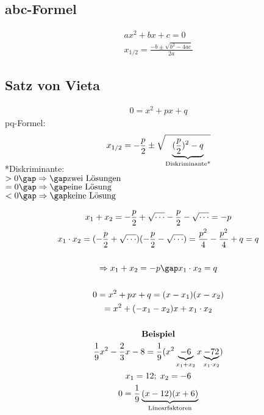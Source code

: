 \subsection{abc-Formel}
\begin{gather*}
  ax^2 + bx + c = 0 \\
  x_{1/2} = \frac{-b \pm \sqrt{b^2 - 4ac}}{2a}
\end{gather*}

\subsection{Satz von Vieta}
\begin{gather*}
  0 = x^2 + px + q
\end{gather*}
pq-Formel:
\begin{gather*}
  x_{1/2} = -\frac{p}{2} \pm \sqrt{\smash[b]{\underbrace{(\frac{p}{2})^2 - q}_{\text{Diskriminante*}}}}
\end{gather*}
\begin{onepage}
  *Diskriminante:\\
  $ > 0 \gap\Rightarrow\gap \text{zwei Lösungen} $ \\
  $ = 0 \gap\Rightarrow\gap \text{eine Lösung} $ \\
  $ < 0 \gap\Rightarrow\gap \text{keine Lösung} $
\end{onepage}
\begin{gather*}
  x_1 + x_2 = -\frac{p}{2} + \sqrt{\cdots} - \frac{p}{2} - \sqrt{\cdots} = -p \\
  x_1 \cdot x_2 = (-\frac{p}{2} + \sqrt{\cdots}) (-\frac{p}{2} - \sqrt{\cdots}) = \frac{p^2}{4} - \frac{p^2}{4} + q = q \\\\
  \Rightarrow x_1 + x_2 = -p \gap x_1 \cdot x_2 = q \\\\
  0 = x^2 + px + q = (x - x_1)(x - x_2) \\
  = x^2 + (-x_1 - x_2)x + x_1 \cdot x_2 \\\\
  \textbf{Beispiel} \\
  \frac{1}{9}x^2 - \frac{2}{3}x - 8 = \frac{1}{9} (x^2 \underbrace{-6}_{x_1 + x_2}x \underbrace{-72}_{x_1 \cdot x_2}) \\
  x_1 = 12; \; x_2 = -6 \\
  0 = \frac{1}{9} \underbrace{(x - 12)(x + 6)}_{\text{Linearfaktoren}}
\end{gather*}

